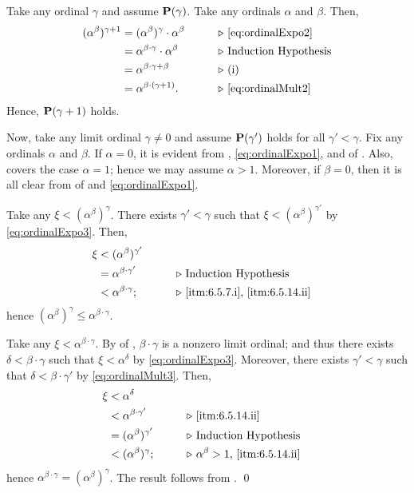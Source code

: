 \documentclass[../introduction_to_set_theory_Note.tex]{subfiles}
\begin{document}
{\begin{enumerate}[nolistsep, label=(\roman*), leftmargin=*, listparindent=\parindent]
    Take any ordinal \(\gamma\) and assume \(\bm{\mathrm{P}}(\gamma)\).
    Take any ordinals \(\alpha\) and \(\beta\). Then,
    \begin{alignat*}{2}
        (\alpha^\beta)^{\gamma + 1}
        &= (\alpha^\beta)^\gamma \cdot \alpha^\beta &\qquad& \comment*{\eqref{eq:ordinalExpo2}} \\
        &= \alpha^{\beta \cdot \gamma} \cdot \alpha^\beta && \comment*{Induction Hypothesis} \\
        &= \alpha^{\beta\cdot \gamma + \beta} && \comment*{(i)} \\
        &= \alpha^{\beta \cdot (\gamma + 1)}. && \comment*{\eqref{eq:ordinalMult2}}
    \end{alignat*}
    Hence, \(\bm{\mathrm{P}}(\gamma + 1)\) holds.

    Now, take any limit ordinal \(\gamma \neq 0\)
    and assume \(\bm{\mathrm{P}}(\gamma')\) holds for all \(\gamma' < \gamma\).
    Fix any ordinals \(\alpha\) and \(\beta\).
    If \(\alpha = 0\), it is evident from ,
    \eqref{eq:ordinalExpo1}, and  of .
    Also,  covers the case \(\alpha = 1\);
    hence we may assume \(\alpha > 1\).
    Moreover, if \(\beta = 0\), then it is all clear from  of 
    and \eqref{eq:ordinalExpo1}.

    Take any \(\xi < (\alpha^\beta)^\gamma\).
    There exists \(\gamma' < \gamma\) such that \(\xi < (\alpha^\beta)^{\gamma'}\)
    by \eqref{eq:ordinalExpo3}.
    Then,
    \begin{alignat*}{2}
        \xi
        &< (\alpha^\beta)^{\gamma'} &\qquad \\
        &= \alpha^{\beta \cdot \gamma'} && \comment*{Induction Hypothesis} \\
        &< \alpha^{\beta \cdot \gamma}; && \comment*{\ref{itm:6.5.7.i}, \ref{itm:6.5.14.ii}}
    \end{alignat*}
    hence \((\alpha^\beta)^\gamma \le \alpha^{\beta \cdot \gamma}\).

    Take any \(\xi < \alpha^{\beta \cdot \gamma}\).
    By  of ,
    \(\beta \cdot \gamma\) is a nonzero limit ordinal;
    and thus there exists \(\delta < \beta \cdot \gamma\)
    such that \(\xi < \alpha^\delta\) by \eqref{eq:ordinalExpo3}.
    Moreover, there exists \(\gamma' < \gamma\)
    such that \(\delta < \beta \cdot \gamma'\) by \eqref{eq:ordinalMult3}. Then,
    \begin{alignat*}{2}
        \xi
        &< \alpha^\delta &\qquad \\
        &< \alpha^{\beta \cdot \gamma'} && \comment*{\ref{itm:6.5.14.ii}} \\
        &= (\alpha^\beta)^{\gamma'} && \comment*{Induction Hypothesis} \\
        &< (\alpha^\beta)^{\gamma}; && \comment*{\(\alpha^\beta > 1\), \ref{itm:6.5.14.ii}}
    \end{alignat*}
    hence \(\alpha^{\beta \cdot \gamma} = (\alpha^\beta)^\gamma\).
    The result follows from .
    \qed
\end{enumerate}
}
\end{document}
